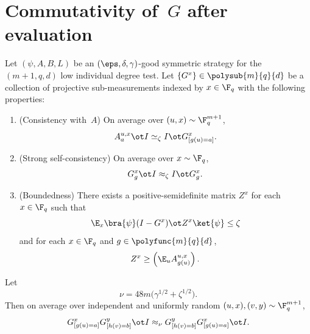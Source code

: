 \section{Commutativity of~$G$ after evaluation}
\label{sec:G-commutes-after-evaluation}

\begin{lemma}\label{lem:comm-data-processed-g}
	\leanok
	Let $(\psi,A,B,L)$ be an $(\eps,\delta,\gamma)$-good symmetric strategy for the $(m+1,q,d)$ low individual degree test.
	Let $\{G^x\} \in \polysub{m}{q}{d}$ be a collection of projective sub-measurements indexed by $x \in \F_q$ with the following properties:
	\begin{enumerate}
		\item (Consistency with~$A$)\label{item:data-processed-consistency}
		      On average over $(u,x) \sim \F_q^{m+1}$,
		      \[
			      A_a^{u,x} \ot I \simeq_\zeta I \ot G^x_{[g(u)=a]}.
		      \]
		\item (Strong self-consistency)\label{item:data-processed-self-consistency}
		      On average over $x \sim \F_q$,
		      \[
			      G_g^x \ot I \approx_\zeta I \ot G_g^x.
		      \]
		\item (Boundedness)\label{item:data-processed-boundedness}
		      There exists a positive-semidefinite matrix $Z^x$ for each $x \in \F_q$ such that
		      \[
			      \E_x \bra{\psi} (I-G^x) \ot Z^x \ket{\psi} \le \zeta
		      \]
		      and for each $x \in \F_q$ and $g \in \polyfunc{m}{q}{d}$,
		      \[
			      Z^x \ge \left(\E_u A_{g(u)}^{u,x}\right).
		      \]
	\end{enumerate}
	Let
	\[
		\nu = 48m\bigl(\gamma^{1/2}+\zeta^{1/2}\bigr).
	\]
	Then on average over independent and uniformly random $(u,x),(v,y) \sim \F_q^{m+1}$,
	\[
		G^x_{[g(u)=a]} G^y_{[h(v)=b]} \ot I \approx_\nu G^y_{[h(v)=b]} G^x_{[g(u)=a]} \ot I.
	\]
\end{lemma}
